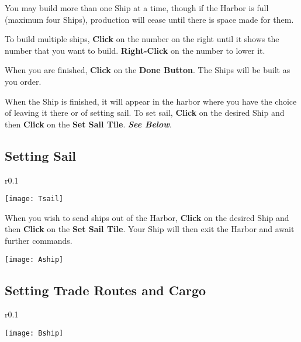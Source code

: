 You may build more than one Ship at a time, though if the Harbor is full (maximum four Ships), production will cease until there is space made for them.

To build multiple ships, \textbf{Click} on the number on the right until it shows the number that you want to build. \textbf{Right-Click} on the number to lower it.

When you are finished, \textbf{Click} on the \textbf{Done Button}. The Ships will be built as you order.

When the Ship is finished, it will appear in the harbor where you have the choice of leaving it there or of setting sail. To set sail, \textbf{Click} on the desired Ship and then \textbf{Click} on the \textbf{Set Sail Tile}. \textbf{\textit{See Below}}.

\subsection{{Setting Sail}}


\begin{wrapfigure}{r}{0.1\textwidth}
    \vspace{-20pt}
    \begin{center}
        \texttt{[image: Tsail]}
    \end{center}
    \vspace{-20pt}
\end{wrapfigure}

When you wish to send ships out of the Harbor, \textbf{Click} on the desired Ship and then \textbf{Click} on the \textbf{Set Sail Tile}. Your Ship will then exit the Harbor and await further commands.

\clearpage

\begin{center}
    \texttt{[image: Aship]}
\end{center}

\subsection{{Setting Trade Routes and Cargo}}


\begin{wrapfigure}{r}{0.1\textwidth}
    \vspace{-20pt}
    \begin{center}
        \texttt{[image: Bship]} %
    \end{center}
    \vspace{-20pt}
\end{wrapfigure}

